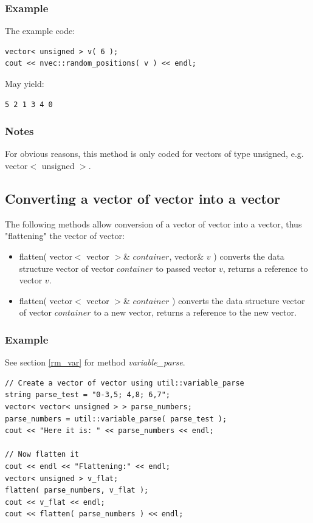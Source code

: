 \documentclass{report}
\begin{document}
\subsubsection{Example}

The example code:

\begin{verbatim}
vector< unsigned > v( 6 );
cout << nvec::random_positions( v ) << endl;
\end{verbatim}

May yield:

\begin{verbatim}
5 2 1 3 4 0
\end{verbatim}

\subsubsection{Notes}
For obvious reasons, this method is only coded for vectors of type
unsigned, e.g. vector$<$ unsigned $>$.

\subsection{Converting a vector of vector into a vector}

The following methods allow conversion of a vector of vector into a
vector, thus "flattening" the vector of vector:

\begin{itemize}
\item flatten( vector$<$ vector $>$\& $container$, vector\& $v$ )
      converts the data structure vector of vector $container$ to
      passed vector $v$, returns a reference to vector $v$.
\item flatten( vector$<$ vector $>$\& $container$ ) converts the data
      structure vector of vector $container$ to a new vector, returns
      a reference to the new vector.
\end{itemize}

\subsubsection{Example}

See section \ref{rm_var} for method {\em variable\_parse}.

\begin{verbatim}
// Create a vector of vector using util::variable_parse
string parse_test = "0-3,5; 4,8; 6,7";
vector< vector< unsigned > > parse_numbers;
parse_numbers = util::variable_parse( parse_test );
cout << "Here it is: " << parse_numbers << endl;

// Now flatten it
cout << endl << "Flattening:" << endl;
vector< unsigned > v_flat;
flatten( parse_numbers, v_flat );
cout << v_flat << endl;
cout << flatten( parse_numbers ) << endl;
\end{verbatim}
\end{document}

